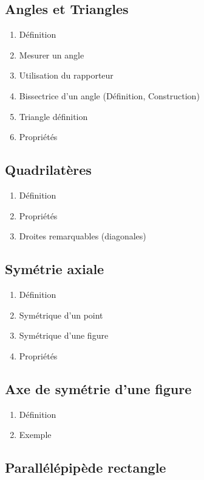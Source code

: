 \subsection{Angles et Triangles}\label{ch_6_angles}

\begin{enumerate}
	\item Définition
	\item Mesurer un angle
	\item Utilisation du rapporteur
	\item Bissectrice d'un angle (Définition, Construction)
	\item Triangle définition
	\item Propriétés
\end{enumerate}

\subsection{Quadrilatères}\label{ch_6_quad}
\begin{enumerate}
	\item Définition
	\item Propriétés
	\item Droites remarquables (diagonales)
\end{enumerate}

\subsection{Symétrie axiale}\label{ch_6_sym}

\begin{enumerate}
	\item Définition
	\item Symétrique d'un point
	\item Symétrique d'une figure
	\item Propriétés
\end{enumerate}

\subsection{Axe de symétrie d'une figure}\label{ch_6_axe}

\begin{enumerate}
	\item Définition
	\item Exemple
\end{enumerate}

\subsection{Parallélépipède rectangle}\label{ch_6_pave}

